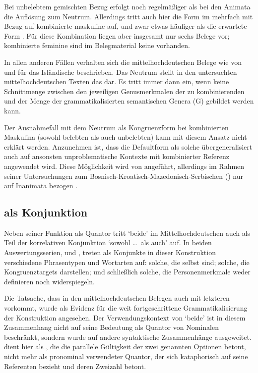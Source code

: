 Bei unbelebtem gemischten Bezug erfolgt noch regelmäßiger als bei den
Animata die Auflösung zum Neutrum. Allerdings
tritt auch hier die Form  im \CAO{} mehrfach mit Bezug auf
kombinierte maskuline  auf, und zwar etwas häufiger als die
erwartete Form . Für diese Kombination liegen aber insgesamt nur
sechs Belege vor; kombinierte feminine  sind im Belegmaterial
keine vorhanden.

In allen anderen Fällen verhalten sich die
mittelhochdeutschen Belege wie von
\citet{wechslerzlatic2003} und \citet{wechsler2009} für das
Isländische beschrieben. Das Neutrum stellt in den untersuchten
mittelhochdeutschen Texten das  dar. Es
tritt immer dann ein, wenn keine Schnittmenge zwischen den jeweiligen
Genusmerkmalen der zu kombinierenden  und der Menge der
grammatikalisierten semantischen Genera (G) gebildet werden
kann.

Der Ausnahmefall mit dem Neutrum als Kongruenzform bei
kombinierten Maskulina (sowohl belebten als auch unbelebten) kann
mit diesem Ansatz nicht erklärt werden. Anzunehmen ist, dass die
Defaultform als solche übergeneralisiert auch
auf ansonsten unproblematische Kontexte mit kombinierter Referenz angewendet
wird. Diese Möglichkeit wird von \citet[302]{corbett1991} angeführt, allerdings
im Rahmen seiner Untersuchungen zum
Bosnisch-\allowbreak{}Kroatisch-\allowbreak{}Mazedonisch-\allowbreak{}Serbischen
() nur auf Inanimata bezogen
\autocites[vgl.~auch][190]{wechslerzlatic2003}[581]{wechsler2009}.

\subsection{ als Konjunktion}

Neben seiner Funktion als Quantor tritt `beide' im
Mittelhochdeutschen auch als Teil der korrelativen
Konjunktion  `sowohl \dots\ als auch' auf. In beiden
Auswertungs\-serien, \CAO{} und \KC{}, treten als Konjunkte in dieser
Konstruktion verschiedene Phrasen\-typen und Wort\-arten auf: solche, die
selbst  sind; solche, die Kongruenztargets darstellen; und
schließlich solche, die Personenmerkmale weder definieren noch widerspiegeln.

Die Tatsache, dass  in den
mittelhochdeutschen Belegen auch mit letzteren vorkommt,
wurde als Evidenz für die weit fortgeschrittene Grammatikalisierung der
Konstruktion angesehen. Der Verwendungskontext von  `beide' ist in
diesem Zusammenhang nicht auf seine Bedeutung als Quantor von Nominalen
beschränkt, sondern wurde auf andere syntaktische Zusammenhänge ausgeweitet.
 dient hier als , die die parallele Gültigkeit
der zwei genannten Optionen betont, nicht mehr als pronominal verwendeter
Quantor, der sich kataphorisch auf seine Referenten bezieht und deren Zweizahl
betont.

